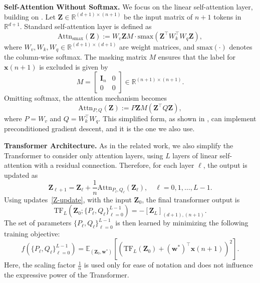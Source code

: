 \documentclass[11pt]{article}
\numberwithin{equation}{section}
\begin{document}
\textbf{Self-Attention Without Softmax.} We focus on the linear self-attention layer, building on \citep{schlag2021linear, von2023transformers}. Let \(\mathbf{Z} \in \mathbb{R}^{(d+1) \times (n+1)}\) be the input matrix of \(n+1\) tokens in \(\mathbb{R}^{d+1}\). Standard self-attention layer is defined as
\begin{equation}
\text{Attn}_{\text{smax}}(\mathbf{Z}) := W_v \mathbf{Z} M \cdot \text{smax}(\mathbf{Z}^{\top} W_k^{\top} W_q \mathbf{Z}),
\end{equation}
where \(W_v, W_k, W_q \in \mathbb{R}^{(d+1) \times (d+1)}\) are weight matrices, and \(\text{smax}(\cdot)\) denotes the column-wise softmax. The masking matrix \(M\) ensures that the label for \(\mathbf{x}(n+1)\) is excluded is given by
\begin{equation}
M = 
\begin{bmatrix}
\mathbf{I}_n & 0 \\
0 & 0
\end{bmatrix} \in \mathbb{R}^{(n+1) \times (n+1)}.
\end{equation}
Omitting softmax, the attention mechanism becomes
\begin{equation}
\label{eq:attention}
\text{Attn}_{P, Q} (\mathbf{Z}) := P \mathbf{Z} M (\mathbf{Z}^{\top} Q \mathbf{Z}),
\end{equation}
where \(P = W_v\) and \(Q = W_k^{\top} W_q\). This simplified form, as shown in \cite{ahn2024transformers}, can implement preconditioned gradient descent, and it is the one we also use.

\textbf{Transformer Architecture.} As in the related work, we also simplify the Transformer to consider only attention layers, using \(L\) layers of linear self-attention with a residual connection. Therefore, for each layer \(\ell\), the output is updated as
\begin{equation}
\mathbf{Z}_{\ell+1} = \mathbf{Z}_\ell + \frac{1}{n} \text{Attn}_{P_\ell, Q_\ell} (\mathbf{Z}_\ell), \quad \ell = 0, 1, \dots, L-1.
\label{Z-update}
\end{equation}
Using updates~\eqref{Z-update}, with the input $\mathbf{Z}_0$, the final transformer output is
\begin{equation}
\text{TF}_L(\mathbf{Z}_0; \{P_\ell, Q_\ell\}_{\ell=0}^{L-1}) = -[\mathbf{Z}_L]_{(d+1), (n+1)}.
\end{equation}
The set of parameters $\{P_\ell, Q_\ell\}_{\ell=0}^{L-1}$ is then learned by minimizing the following training objective:
\begin{equation}
f\left(\{P_\ell, Q_\ell\}_{\ell=0}^{L-1}\right) = \mathbb{E}_{(\mathbf{Z}_0, \mathbf{w}^*)} \left[\left( \text{TF}_L(\mathbf{Z}_0) + (\mathbf{w}^{*})^{\top} \mathbf{x}(n+1) \right)^2 \right].
\label{in-context_f}
\end{equation}
Here, the scaling factor \(\frac{1}{n}\) is used only for ease of notation and does not influence the expressive power of the Transformer.
\end{document}

